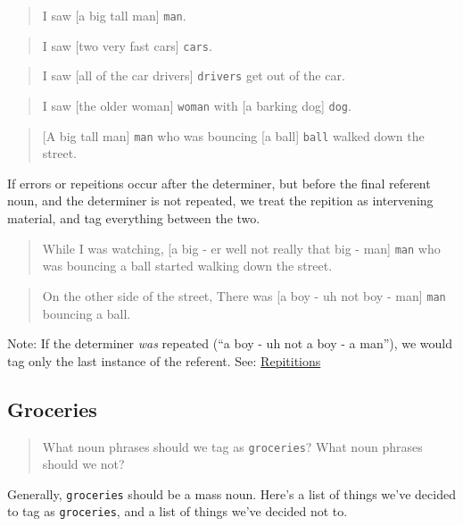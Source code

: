 \documentclass[
]{book}
\begin{document}
\begin{quote}
I saw {[}a big tall man{]} \texttt{man}.
\end{quote}

\begin{quote}
I saw {[}two very fast cars{]} \texttt{cars}.
\end{quote}

\begin{quote}
I saw {[}all of the car drivers{]} \texttt{drivers} get out of the car.
\end{quote}

\begin{quote}
I saw {[}the older woman{]} \texttt{woman} with {[}a barking dog{]} \texttt{dog}.
\end{quote}

\begin{quote}
{[}A big tall man{]} \texttt{man}
who was bouncing {[}a ball{]} \texttt{ball} walked down the street.
\end{quote}

If errors or repeitions occur after the determiner,
but before the final referent noun,
and the determiner is not repeated,
we treat the repition as intervening material,
and tag everything between the two.

\begin{quote}
While I was watching,
{[}a big - er well not really that big - man{]} \texttt{man}
who was bouncing a ball started walking down the street.
\end{quote}

\begin{quote}
On the other side of the street,
There was {[}a boy - uh not boy - man{]} \texttt{man} bouncing a ball.
\end{quote}

Note:
If the determiner \emph{was} repeated (``a boy - uh not a boy - a man''),
we would tag only the last instance of the referent.
See: \protect\hyperlink{repititions}{Repititions}

\hypertarget{groceries}{%
\subsection{Groceries}\label{groceries}}

\begin{quote}
What noun phrases should we tag as \texttt{groceries}? What noun phrases should we not?
\end{quote}

Generally, \texttt{groceries} should be a mass noun.
Here's a list of things we've decided to tag as \texttt{groceries}, and a list of things we've decided not to.
\end{document}
